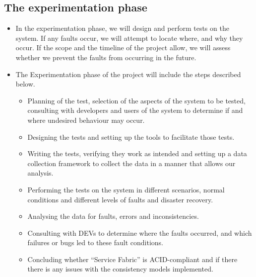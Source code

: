 \subsection{The experimentation phase}
\begin{itemize}
\item	In the experimentation phase, we will design and perform tests on the system. If any faults occur, we will attempt to locate where, and why they occur. If the scope and the timeline of the project allow, we will assess whether we prevent the faults from occurring in the future.
\item	The Experimentation phase of the project will include the steps described below. 
\begin{itemize}
\item	Planning of the test, selection of the aspects of the system to be tested, consulting with developers and users of the system to determine if and where undesired behaviour may occur.
\item	Designing the tests and setting up the tools to facilitate those tests.
\item	Writing the tests, verifying they work as intended and setting up a data collection framework to collect the data in a manner that allows our analysis.
\item	Performing the tests on the system in different scenarios, normal conditions and different levels of faults and disaster recovery.
\item	Analysing the data for faults, errors and inconsistencies.
\item	Consulting with DEVs to determine where the faults occurred, and which failures or bugs led to these fault conditions.
\item	Concluding whether “Service Fabric” is ACID-compliant and if there there is any issues with the consistency models implemented.
\end{itemize}
\end{itemize}
